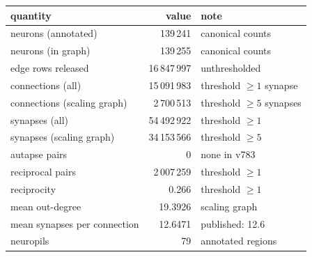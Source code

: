 {\small\setlength{\tabcolsep}{3pt}
\begin{tabular}{l r p{8.0cm}}
\toprule
quantity & value & note \\
\midrule
neurons (annotated) & 139\,241 & canonical counts \\
neurons (in graph) & 139\,255 & canonical counts \\
edge rows released & 16\,847\,997 & unthresholded \\
connections (all) & 15\,091\,983 & threshold $\geq 1$ synapse \\
connections (scaling graph) & 2\,700\,513 & threshold $\geq 5$ synapses \\
synapses (all) & 54\,492\,922 & threshold $\geq 1$ \\
synapses (scaling graph) & 34\,153\,566 & threshold $\geq 5$ \\
autapse pairs & 0 & none in v783 \\
reciprocal pairs & 2\,007\,259 & threshold $\geq 1$ \\
reciprocity & 0.266 & threshold $\geq 1$ \\
mean out-degree & 19.3926 & scaling graph \\
mean synapses per connection & 12.6471 & published: 12.6 \\
neuropils & 79 & annotated regions \\
\bottomrule
\end{tabular}

}
